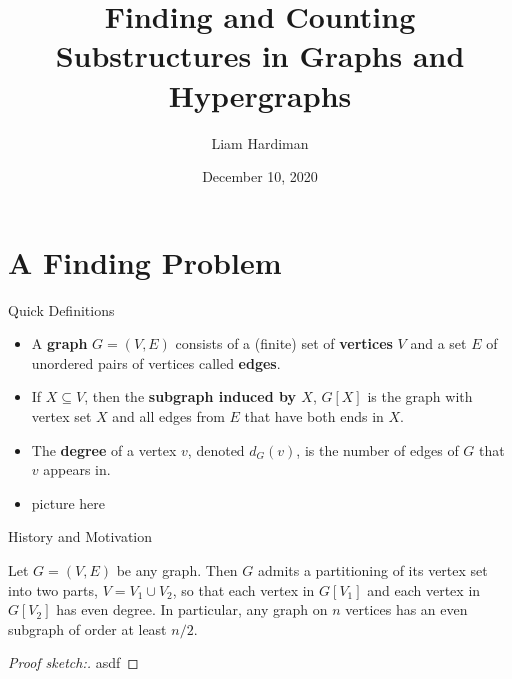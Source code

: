 \documentclass{beamer}
\title{Finding and Counting Substructures in Graphs and Hypergraphs}
\author{Liam Hardiman}
\date{December 10, 2020}
\theoremstyle{plain}
\begin{document}
\maketitle



\section{A Finding Problem}
	\begin{frame}{Quick Definitions}
		\begin{itemize}
			\item A \textbf{graph} $G = (V, E)$ consists of a (finite) set of \textbf{vertices} $V$ and a set $E$ of unordered pairs of vertices called \textbf{edges}.\pause

			\item If $X\subseteq V$, then the \textbf{subgraph induced by $X$}, $G[X]$ is the graph with vertex set $X$ and all edges from $E$ that have both ends in $X$.\pause

			\item The \textbf{degree} of a vertex $v$, denoted $d_G(v)$, is the number of edges of $G$ that $v$ appears in.\pause

			\item picture here
		\end{itemize}
	\end{frame}


	\begin{frame}{History and Motivation}
		\begin{theorem}
			Let $G = (V, E)$ be any graph.
			Then $G$ admits a partitioning of its vertex set into two parts, $V = V_1 \cup V_2$, so that each vertex in $G[V_1]$ and each vertex in $G[V_2]$ has even degree.
			In particular, any graph on $n$ vertices has an even subgraph of order at least $n/2$.
		\end{theorem}\pause

		\begin{proof}[Proof sketch:]
			asdf
		\end{proof}
	\end{frame}
\end{document}
